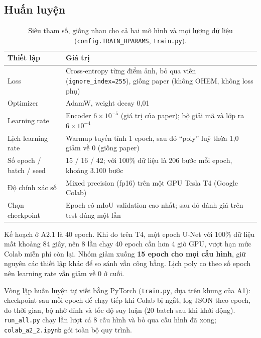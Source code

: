\documentclass[12pt]{article}
\newcommand{\code}[1]{\texttt{#1}}
\newcommand{\st}[1]{\textbf{#1}}
\begin{document}
\subsection{Huấn luyện}\label{sec:train}
\begin{table}[H]
\centering
\caption{Siêu tham số, giống nhau cho cả hai mô hình và mọi lượng dữ liệu (\code{config.TRAIN\_HPARAMS}, \code{train.py}).}\label{tab:hparams}
\begin{tabularx}{\linewidth}{@{}P{3.6cm}L@{}}
\toprule
Thiết lập & Giá trị \\\midrule
Loss & Cross-entropy từng điểm ảnh, bỏ qua viền (\code{ignore\_index=255}), giống paper (không OHEM, không loss phụ) \\
Optimizer & AdamW, weight decay 0,01 \\
Learning rate & Encoder $6\times10^{-5}$ (giá trị của paper); bộ giải mã và lớp ra $6\times10^{-4}$ \\
Lịch learning rate & Warmup tuyến tính 1 epoch, sau đó ``poly'' luỹ thừa 1,0 giảm về 0 (giống paper) \\
Số epoch / batch / seed & 15 / 16 / 42; với 100\% dữ liệu là 206 bước mỗi epoch, khoảng 3.100 bước \\
Độ chính xác số & Mixed precision (fp16) trên một GPU Tesla T4 (Google Colab) \\
Chọn checkpoint & Epoch có mIoU validation cao nhất; sau đó đánh giá trên test đúng một lần \\
\bottomrule
\end{tabularx}
\end{table}

Kế hoạch ở A2.1 là 40 epoch. Khi đo trên T4, một epoch U-Net với 100\% dữ liệu mất khoảng 84 giây, nên 8 lần chạy
40 epoch cần hơn 4 giờ GPU, vượt hạn mức Colab miễn phí còn lại. Nhóm giảm xuống \st{15 epoch cho mọi cấu hình}, giữ nguyên
các thiết lập khác để so sánh vẫn công bằng. Lịch poly co theo số epoch nên learning rate vẫn giảm về 0 ở cuối.

Vòng lặp huấn luyện tự viết bằng PyTorch (\code{train.py}, dựa trên khung của A1): checkpoint sau mỗi epoch để chạy tiếp
khi Colab bị ngắt, log JSON theo epoch, đo thời gian, bộ nhớ đỉnh và tốc độ suy luận (20 batch sau khi khởi động).
\code{run\_all.py} chạy lần lượt cả 8 cấu hình và bỏ qua cấu hình đã xong; \code{colab\_a2\_2.ipynb} gói toàn bộ quy trình.
\end{document}
